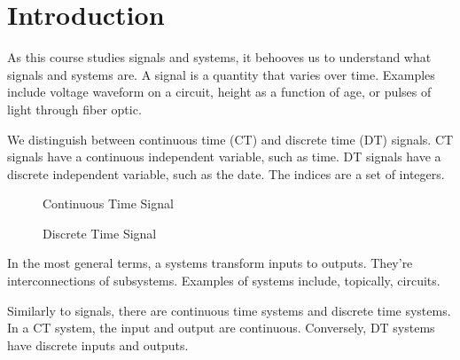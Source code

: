 \section{Introduction}
As this course studies signals and systems, it behooves us to understand
what signals and systems are. A signal is a quantity that varies over time.
Examples include voltage waveform on a circuit, height as a function
of age, or pulses of light through fiber optic.

We distinguish between continuous time (CT) and discrete time (DT) signals.
CT signals have a continuous independent variable, such as time.
DT signals have a discrete independent variable, such as the date. The indices
are a set of integers.

\begin{figure}[h]
    \centering
    \caption{Continuous Time Signal}
    \label{CT signal}
\end{figure}

\begin{figure}[h]
    \centering
    \caption{Discrete Time Signal}
    \label{DT signal}
\end{figure}

In the most general terms, a systems transform inputs
to outputs. They're interconnections of subsystems.
Examples of systems include, topically, circuits.

Similarly to signals, there are continuous time systems
and discrete time systems. In a CT system, the input and
output are continuous. Conversely, DT systems have discrete
inputs and outputs.

